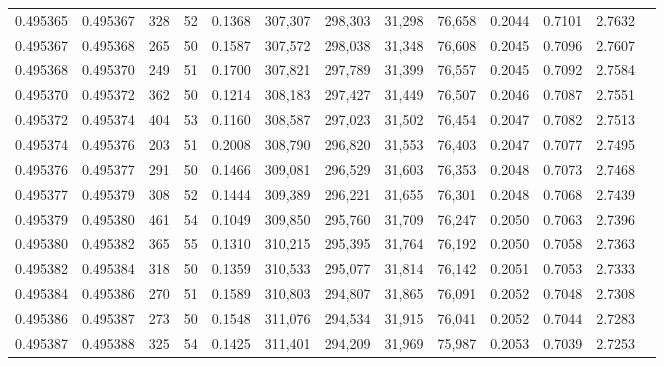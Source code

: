 \begin{tabular}{rrrrrrrrrrrrr}
0.495365 & 0.495367 &   328 &  52 &                                     0.1368 & 307,307 & 298,303 &  31,298 &  76,658 & 0.2044 & 0.7101 & 2.7632 \\
0.495367 & 0.495368 &   265 &  50 &                                     0.1587 & 307,572 & 298,038 &  31,348 &  76,608 & 0.2045 & 0.7096 & 2.7607 \\
0.495368 & 0.495370 &   249 &  51 &                                     0.1700 & 307,821 & 297,789 &  31,399 &  76,557 & 0.2045 & 0.7092 & 2.7584 \\
0.495370 & 0.495372 &   362 &  50 &                                     0.1214 & 308,183 & 297,427 &  31,449 &  76,507 & 0.2046 & 0.7087 & 2.7551 \\
0.495372 & 0.495374 &   404 &  53 &                                     0.1160 & 308,587 & 297,023 &  31,502 &  76,454 & 0.2047 & 0.7082 & 2.7513 \\
0.495374 & 0.495376 &   203 &  51 &                                     0.2008 & 308,790 & 296,820 &  31,553 &  76,403 & 0.2047 & 0.7077 & 2.7495 \\
0.495376 & 0.495377 &   291 &  50 &                                     0.1466 & 309,081 & 296,529 &  31,603 &  76,353 & 0.2048 & 0.7073 & 2.7468 \\
0.495377 & 0.495379 &   308 &  52 &                                     0.1444 & 309,389 & 296,221 &  31,655 &  76,301 & 0.2048 & 0.7068 & 2.7439 \\
0.495379 & 0.495380 &   461 &  54 &                                     0.1049 & 309,850 & 295,760 &  31,709 &  76,247 & 0.2050 & 0.7063 & 2.7396 \\
0.495380 & 0.495382 &   365 &  55 &                                     0.1310 & 310,215 & 295,395 &  31,764 &  76,192 & 0.2050 & 0.7058 & 2.7363 \\
0.495382 & 0.495384 &   318 &  50 &                                     0.1359 & 310,533 & 295,077 &  31,814 &  76,142 & 0.2051 & 0.7053 & 2.7333 \\
0.495384 & 0.495386 &   270 &  51 &                                     0.1589 & 310,803 & 294,807 &  31,865 &  76,091 & 0.2052 & 0.7048 & 2.7308 \\
0.495386 & 0.495387 &   273 &  50 &                                     0.1548 & 311,076 & 294,534 &  31,915 &  76,041 & 0.2052 & 0.7044 & 2.7283 \\
0.495387 & 0.495388 &   325 &  54 &                                     0.1425 & 311,401 & 294,209 &  31,969 &  75,987 & 0.2053 & 0.7039 & 2.7253 \\

\end{tabular}
